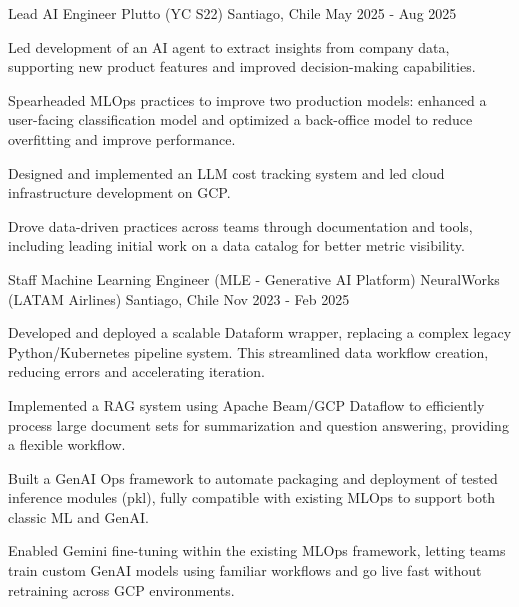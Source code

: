 \cventry
{Lead AI Engineer}
{Plutto (YC S22)}
{Santiago, Chile}
{May 2025 - Aug 2025}
{
\begin{cvitems}
    \item Led development of an AI agent to extract insights from company data, supporting new product features and improved decision-making capabilities.
    \item Spearheaded MLOps practices to improve two production models: enhanced a user-facing classification model and optimized a back-office model to reduce overfitting and improve performance.
    \item Designed and implemented an LLM cost tracking system and led cloud infrastructure development on GCP.
    \item Drove data-driven practices across teams through documentation and tools, including leading initial work on a data catalog for better metric visibility.
\end{cvitems}
}

\cventry
{Staff Machine Learning Engineer (MLE - Generative AI Platform)}
{NeuralWorks (LATAM Airlines)}
{Santiago, Chile}
{Nov 2023 - Feb 2025}
{
\begin{cvitems}
    \item Developed and deployed a scalable Dataform wrapper, replacing a complex legacy Python/Kubernetes pipeline system. This streamlined data workflow creation, reducing errors and accelerating iteration.
    \item Implemented a RAG system using Apache Beam/GCP Dataflow to efficiently process large document sets for summarization and question answering, providing a flexible workflow.
    \item Built a GenAI Ops framework to automate packaging and deployment of tested inference modules (pkl), fully compatible with existing MLOps to support both classic ML and GenAI.
    \item Enabled Gemini fine-tuning within the existing MLOps framework, letting teams train custom GenAI models using familiar workflows and go live fast without retraining across GCP environments.
\end{cvitems}
}

